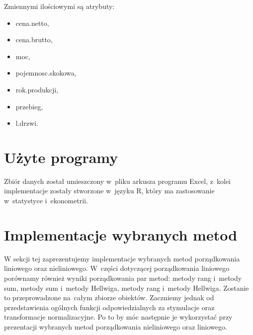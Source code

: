 \documentclass[12pt,a4paper]{report}
\begin{document}
Zmiennymi ilościowymi są atrybuty:
\begin{multicols}{3}
\begin{itemize}
 \item cena.netto,%
 \item cena.brutto,%
 \item moc,%
 \item pojemnosc.skokowa,%
 \item rok.produkcji, %
 \item przebieg,%
 \item l.drzwi. %
\end{itemize}
\end{multicols}

%

\section{Użyte programy}
Zbiór danych został umieszczony w~pliku arkusza programu Excel, z~kolei implementacje zostały stworzone w~języku R, który ma zastosowanie w~statystyce i~ekonometrii. 


\section{Implementacje wybranych metod}
W sekcji tej zaprezentujemy implementacje wybranych metod porządkowania liniowego oraz nieliniowego. W~części dotyczącej porządkowania liniowego porównamy również wyniki porządkowania par metod: metody rang i~metody sum, metody sum i~metody Hellwiga, metody rang i~metody Hellwiga. Zostanie to przeprowadzone na~całym zbiorze obiektów. 
Zaczniemy jednak od przedstawienia ogólnych funkcji odpowiedzialnych za stymulacje oraz transformacje normalizacyjne. Po to by móc następnie je wykorzystać przy prezentacji wybranych metod porządkowania nieliniowego oraz liniowego. 
\end{document}
